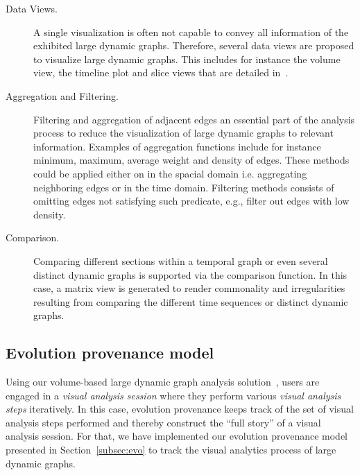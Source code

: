 \begin{description}
	\item[Data Views.] 
A single visualization is often not capable to convey all information of the exhibited large dynamic graphs.
Therefore, several data views are proposed to visualize large dynamic graphs.
This includes for instance the volume view, the timeline plot and slice views that are detailed in~\cite{Bruder2019}.
	\item[Aggregation and Filtering.] 
Filtering and aggregation of adjacent edges an essential part of the analysis process to reduce the visualization of large dynamic graphs to relevant information.
Examples of aggregation functions include for instance minimum, maximum, average weight and density of edges. These methods could be applied either on in the spacial domain i.e. aggregating neighboring edges or in the time domain.
Filtering methods consists of omitting edges not satisfying such predicate, e.g., filter out edges with low density.
\item[Comparison.] 
Comparing different sections within a temporal graph or even several distinct dynamic graphs is supported via the comparison function. 
In this case, a matrix view is generated to render commonality and irregularities resulting from comparing the different time sequences or distinct dynamic graphs.
\end{description}

		
\subsection{Evolution provenance model}\label{A02:evoDM}
Using our volume-based large dynamic graph analysis solution~\cite{Bruder2019},
users are engaged in a \emph{visual analysis session} where they perform various \emph{visual analysis steps} iteratively. 
In this case, evolution provenance keeps track of the set of visual analysis steps performed and thereby construct the ``full story'' of a visual analysis session.
For that, we have implemented our evolution provenance model presented in Section~\ref{subsec:evo} to track the visual analytics process of large dynamic graphs. 



